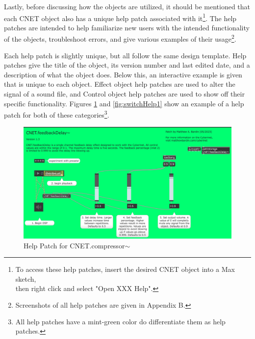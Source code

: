 Lastly, before discussing how the objects are utilized, it should be mentioned that each CNET object also has a unique help patch associated with it\footnote{To access these help patches, insert the desired CNET object into a Max sketch, \\ then right click and select "Open XXX Help".}. The help patches are intended to help familiarize new users with the intended functionality of the objects, troubleshoot errors, and give various examples of their usage\footnote{Screenshots of all help patches are given in Appendix B.}.

Each help patch is slightly unique, but all follow the same design template. Help patches give the title of the object, its version number and last edited date, and a description of what the object does. Below this, an interactive example is given that is unique to each object. Effect object help patches are used to alter the signal of a sound file, and Control object help patches are used to show off their specific functionality. Figures \ref{fig:compHelp1} and \ref{fig:switchHelp1} show an example of a help patch for both of these categories\footnote{All help patches have a mint-green color do differentiate them as help patches.}.

\begin{figure}
    \centering
    \includegraphics[scale=0.6]{diagrams/maxPatches/compressorHelp.png}
    \caption{Help Patch for CNET.compressor$\sim$}
    \label{fig:compHelp1}
\end{figure}

